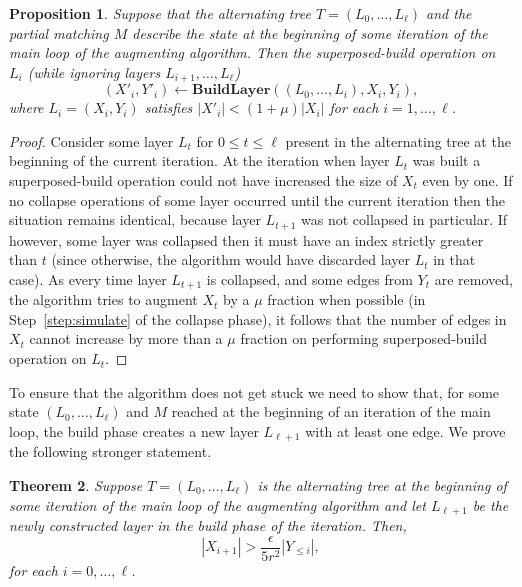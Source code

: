 \documentclass[11pt]{article}
\newtheorem{theorem}{Theorem}[section]
\newtheorem{proposition}[theorem]{Proposition}
\theoremstyle{definition}
\theoremstyle{remark}
\begin{document}
\begin{proposition}\label{lem:noaugment}
  Suppose that the alternating tree $T=(L_0,\dots,L_\ell)$ and the
  partial matching $M$ describe the state at the beginning of some
  iteration of the main loop of the augmenting algorithm.  Then the
  superposed-build operation on $L_i$ (while ignoring layers
  $L_{i+1},\dots, L_\ell$)
  \[(X'_i, Y'_i) \gets \textbf{BuildLayer}((L_0,\dots, L_i), X_i,
    Y_i),\]
  where $L_i = (X_i, Y_i)$ satisfies $|X'_i| < (1+\mu)|X_i|$ for each
  $i=1,\dots, \ell$.
\end{proposition}

\begin{proof}
  Consider some layer $L_t$ for $0 \leq t \leq \ell$ present in the
  alternating tree at the beginning of the current iteration. At the
  iteration when layer $L_t$ was built a superposed-build operation
  could not have increased the size of $X_t$ even by one. If no
  collapse operations of some layer occurred until the current
  iteration then the situation remains identical, because layer
  $L_{t+1}$ was not collapsed in particular. If however, some layer
  was collapsed then it must have an index strictly greater than $t$
  (since otherwise, the algorithm would have discarded layer $L_t$ in
  that case). As every time layer $L_{t+1}$ is collapsed, and some
  edges from $Y_t$ are removed, the algorithm tries to augment $X_t$
  by a $\mu$ fraction when possible (in Step~\ref{step:simulate} of
  the collapse phase), it follows that the number of edges in $X_t$
  cannot increase by more than a $\mu$ fraction on performing
  superposed-build operation on $L_t$.
\end{proof}



To ensure that the algorithm does not get stuck we need to show that, for some state $(L_0,\dots,L_\ell)$ and $M$ reached at the beginning of an iteration of the main loop, the build phase creates a new layer $L_{\ell+1}$ with at least one edge. We prove the following stronger statement.

\begin{theorem}\label{lem:addable}
  Suppose $T=(L_0,\dots,L_\ell)$ is the alternating tree at the beginning of some iteration of the main loop of the augmenting algorithm and let $L_{\ell+1}$ be the newly constructed layer in the build phase of the iteration. Then,
  \[ |X_{i+1}| > \frac{\epsilon}{5r^2} |Y_{\leq i}|,\]
  for each $i=0,\dots,\ell$.
\end{theorem}
\end{document}
